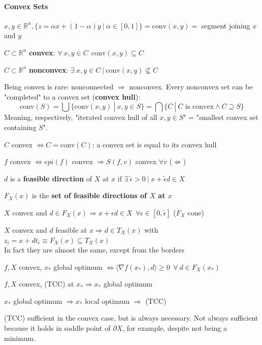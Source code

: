 \documentclass[10pt]{report}
\begin{document}
\paragraph{Convex Sets} $x,y\in \mathbb{R}^n,\{z=\alpha x+(1-\alpha)y\:|\:\alpha\in[0,1]\} = \text{conv}(x,y) =$ segment joining $x$ and $y$
\begin{list}{}{}
	\item $C\subset \mathbb{R}^n$ \textbf{convex}: $\forall\:x,y\in C\:\:\text{conv}(x,y)\subseteq C$
	\item $C\subset \mathbb{R}^n$ \textbf{nonconvex}: $\exists\:x,y\in C\:|\:\text{conv}(x,y)\not\subseteq C$
\end{list}
Being convex is rare: nonconnected $\Rightarrow$ nonconvex. Every nonconvex set can be "completed" to a convex set (\textbf{convex hull}):
$$\text{conv}(S) = \bigcup\{\text{conv}(x,y)\:|\:x,y\in S\} = \bigcap\{C\:|\:C\text{ is convex}\wedge C\supseteq S\}$$
Meaning, respectively, "iterated convex hull of all $x,y\in S$" = "smallest convex set containing $S$".\begin{list}{}{}
	\item $C$ convex $\Leftrightarrow C = \text{conv}(C)$: a convex set is equal to its convex hull
	\item $f$ convex $\Leftrightarrow epi(f)$ convex $\Rightarrow S(f,v)$ convex $\forall v$ ($\not\Leftarrow$)
	\item $d$ is a \textbf{feasible direction} of $X$ at $x$ if $\exists\:\tilde{\epsilon}>0\:|\:x+\tilde{\epsilon}d \in X$
	\item $F_X(x)$ is the \textbf{set of feasible directions of $X$ at $x$}
	\item $X$ convex and $d\in F_X(x)\Rightarrow x+\epsilon d\in X\:\:\forall
	\epsilon\in [0,\tilde{\epsilon}]$ ($F_X$ cone)
	\item $X$ convex and $d$ feasible at $x \Rightarrow d\in T_X(x)$ with $z_i = x + dt_i \equiv F_X(x)\subseteq T_X(x)$\\
	In fact they are almost the same, except from the borders
	\item $f,X$ convex, $x_*$ global optimum $\Leftrightarrow\langle\nabla f(x_*),d\rangle \geq 0\:\:\forall\:d\in F_X(x_*)$
	\item $f,X$ convex, (TCC) at $x_*\Rightarrow x_*$ global optimum
	\item $x_*$ global optimum $\Rightarrow x_*$ local optimum $\Rightarrow$ (TCC)
\end{list}
(TCC) sufficient in the convex case, but is always necessary. Not always sufficient because it holds in saddle point of $\partial X$, for example, despite not being a minimum.\\
\end{document}
